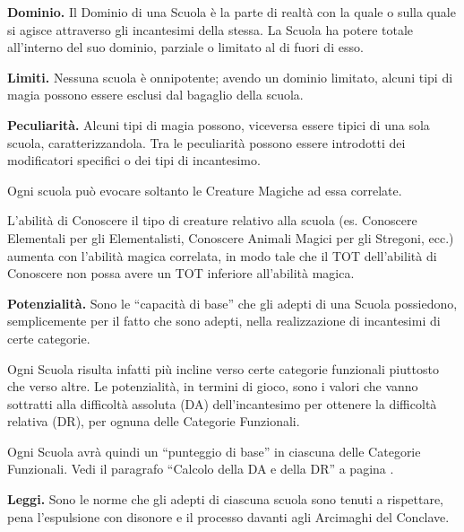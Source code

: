 \begin{description}
  
\item{\bf Dominio.} Il Dominio di una Scuola \`e la parte di
  realt\`a con la quale o sulla quale si agisce attraverso gli
  incantesimi della stessa.  La Scuola ha potere totale all'interno
  del suo dominio, parziale o limitato al di fuori di esso.
  
\item{\bf Limiti.} Nessuna scuola \`e onnipotente; avendo un dominio
  limitato, alcuni tipi di magia possono essere esclusi dal bagaglio
  della scuola.
  
\item{\bf Peculiarit\`a.} Alcuni tipi di magia possono, viceversa
  essere tipici di una sola scuola, caratterizzandola. Tra le
  peculiarit\`a possono essere introdotti dei modificatori specifici
  o dei tipi di incantesimo.  
  
  Ogni scuola pu\`o evocare soltanto le Creature Magiche ad essa
  correlate.  
  
  L'abilit\`a di Conoscere il tipo di creature relativo alla scuola
  (es. Conoscere Elementali per gli Elementalisti, Conoscere Animali
  Magici per gli Stregoni, ecc.)  aumenta con l'abilit\`a magica
  correlata, in modo tale che il TOT dell'abilit\`a di Conoscere non
  possa avere un TOT inferiore all'abilit\`a magica.
  
\item{\bf Potenzialit\`a.}  Sono le ``capacit\`a di base'' che gli
  adepti di una Scuola possiedono, semplicemente per il fatto che sono
  adepti, nella realizzazione di incantesimi di certe categorie.
  
  Ogni Scuola risulta infatti pi\`u incline verso certe categorie
  funzionali piuttosto che verso altre. Le potenzialit\`a, in
  termini di gioco, sono i valori che vanno sottratti alla
  difficolt\`a assoluta (DA) dell'incantesimo per ottenere la
  difficolt\`a relativa (DR), per ognuna delle Categorie Funzionali.
  
  Ogni Scuola avr\`a quindi un ``punteggio di base'' in ciascuna delle
  Categorie Funzionali. Vedi il paragrafo ``Calcolo della DA e della
  DR'' a pagina \pageref{dadr}.
  
\item{\bf Leggi.} Sono le norme che gli adepti di ciascuna scuola sono
  tenuti a rispettare, pena l'espulsione con disonore e il processo
  davanti agli Arcimaghi del Conclave.

\end{description}

